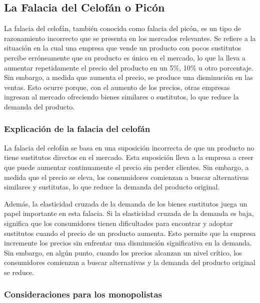 \documentclass[
  a4paper,
]{article}
\theoremstyle{definition}
\theoremstyle{remark}
\begin{document}
\hypertarget{la-falacia-del-celofuxe1n-o-picuxf3n}{%
\subsection{La Falacia del Celofán o
Picón}\label{la-falacia-del-celofuxe1n-o-picuxf3n}}

La falacia del celofán, también conocida como falacia del picón, es un
tipo de razonamiento incorrecto que se presenta en los mercados
relevantes. Se refiere a la situación en la cual una empresa que vende
un producto con pocos sustitutos percibe erróneamente que su producto es
único en el mercado, lo que la lleva a aumentar repetidamente el precio
del producto en un 5\%, 10\% u otro porcentaje. Sin embargo, a medida
que aumenta el precio, se produce una disminución en las ventas. Esto
ocurre porque, con el aumento de los precios, otras empresas ingresan al
mercado ofreciendo bienes similares o sustitutos, lo que reduce la
demanda del producto.

\hypertarget{explicaciuxf3n-de-la-falacia-del-celofuxe1n}{%
\subsubsection{Explicación de la falacia del
celofán}\label{explicaciuxf3n-de-la-falacia-del-celofuxe1n}}

La falacia del celofán se basa en una suposición incorrecta de que un
producto no tiene sustitutos directos en el mercado. Esta suposición
lleva a la empresa a creer que puede aumentar continuamente el precio
sin perder clientes. Sin embargo, a medida que el precio se eleva, los
consumidores comienzan a buscar alternativas similares y sustitutas, lo
que reduce la demanda del producto original.

Además, la elasticidad cruzada de la demanda de los bienes sustitutos
juega un papel importante en esta falacia. Si la elasticidad cruzada de
la demanda es baja, significa que los consumidores tienen dificultades
para encontrar y adoptar sustitutos cuando el precio de un producto
aumenta. Esto permite que la empresa incremente los precios sin
enfrentar una disminución significativa en la demanda. Sin embargo, en
algún punto, cuando los precios alcanzan un nivel crítico, los
consumidores comienzan a buscar alternativas y la demanda del producto
original se reduce.

\hypertarget{consideraciones-para-los-monopolistas}{%
\subsubsection{Consideraciones para los
monopolistas}\label{consideraciones-para-los-monopolistas}}
\end{document}

